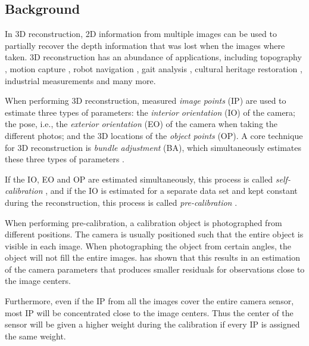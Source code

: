 \subsection{Background}
    \label{sec:background}

    In 3D reconstruction, 2D information from multiple images can be used to 
    partially recover the depth information that was lost when the images where taken.
    3D reconstruction has an abundance of applications,
    including topography \cite{Fraser1989:Optimization}, 
    motion capture \cite{DApuzzo2003:Thesis}, 
    robot navigation \cite{Cornelis2008:3D}, gait analysis \citep{Brostrm2004},
    cultural heritage restoration \cite{Grun2004:Photogrammetric},
    industrial measurements \cite{Fraser1995:Multi_sensor_self_calib}
    and many more.

    When performing 3D reconstruction, measured \textit{image points} (IP) 
    are used to estimate three types of parameters: 
    the \textit{interior orientation} (IO) of the camera;
    the pose, i.e., the \textit{exterior orientation} (EO) 
    of the camera when taking the different photos; and the 
    3D locations of the \textit{object points} (OP).
    A core technique for 3D reconstruction is \textit{bundle adjustment} (BA),
    which simultaneously estimates these three types of parameters
    \citep[Ch. 15]{forstner_pmv}.

    If the IO, EO and OP are estimated simultaneously, 
    this process is called \textit{self-calibration} \citep{Kenefick1972:Analytical}, 
    and if the IO is estimated for a separate data set and kept
    constant during the reconstruction,
    this process is called \textit{pre-calibration}
    \citep[Ch. 15.4]{forstner_pmv}.

    When performing pre-calibration, 
    a calibration object is photographed from different positions.
    The camera is usually positioned such that the entire
    object is visible in each image.
    When photographing the object from certain angles, 
    the object will not fill the entire images.
    \citet{Fraser1997:Digital, fraser_close_range} 
    has shown that this results in an estimation of the camera 
    parameters that produces smaller residuals for observations
    close to the image centers.

    Furthermore, even if the IP from all the images 
    cover the entire camera sensor,
    most IP will be concentrated close to the image centers.
    Thus the center of the sensor will be given a higher weight
    during the calibration if every IP is assigned the same weight.
    
